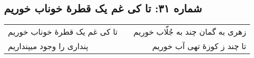 \begin{center}
\section*{شماره ۳۱: تا کی غم یک قطرۀ خوناب خوریم}
\label{sec:031}
\begin{longtable}{l p{0.5cm} r}
تا کی غم یک قطرهٔ خوناب خوریم
&&
زهری به گمان چند به جُلّاب خوریم
\\
پنداری را وجود میپنداریم
&&
تا چند ز کوزهٔ تهی آب خوریم
\\
\end{longtable}
\end{center}
